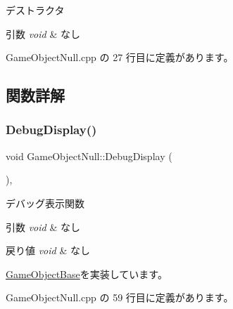デストラクタ 


\begin{DoxyParams}{引数}
{\em void} & なし \\
\hline
\end{DoxyParams}


 Game\+Object\+Null.\+cpp の 27 行目に定義があります。



\subsection{関数詳解}
\mbox{\label{class_game_object_null_a9bc551307ae5aa0ad8e754f976ffd1c7}} 
\subsubsection{\texorpdfstring{Debug\+Display()}{DebugDisplay()}}
{\footnotesize\ttfamily void Game\+Object\+Null\+::\+Debug\+Display (\begin{DoxyParamCaption}{ }\end{DoxyParamCaption})\hspace{0.3cm}{\ttfamily [override]}, {\ttfamily [virtual]}}



デバッグ表示関数 


\begin{DoxyParams}{引数}
{\em void} & なし \\
\hline
\end{DoxyParams}

\begin{DoxyRetVals}{戻り値}
{\em void} & なし \\
\hline
\end{DoxyRetVals}


\mbox{\hyperlink{class_game_object_base_ac5dcc38beb0ce6d66bec6bb30ad9d168}{Game\+Object\+Base}}を実装しています。



 Game\+Object\+Null.\+cpp の 59 行目に定義があります。

\mbox{\label{class_game_object_null_abc4e2c2ce54fb3d0bc3f0b45149a66cb}} 
